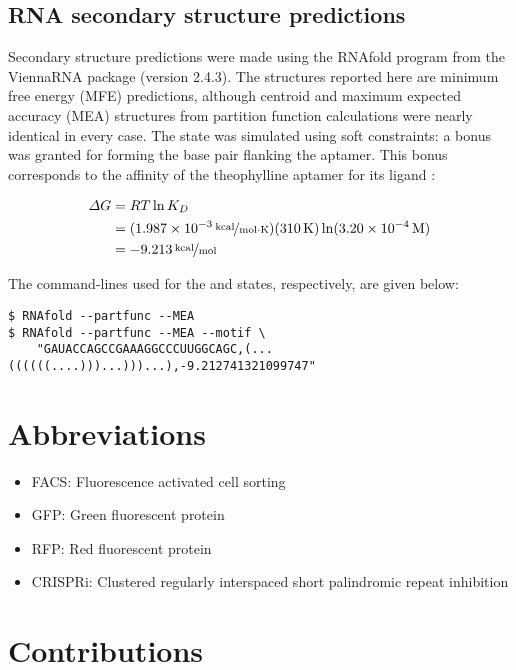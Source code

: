\documentclass[10pt,oneside]{article}
\begin{document}
\subsection{RNA secondary structure predictions}

Secondary structure predictions were made using the RNAfold program from the ViennaRNA package (version 2.4.3).  The structures reported here are minimum free energy (MFE) predictions, although centroid and maximum expected accuracy (MEA) structures from partition function calculations were nearly identical in every case.  The \holo{} state was simulated using soft constraints: a  bonus was granted for forming the base pair flanking the aptamer.  This bonus corresponds to the  affinity of the theophylline aptamer for its ligand \autocite{jenison1994}:

\begin{align*}
\Delta G
    &= RT \ln K_D \\
    &= (\unitfrac[\mathrm{1.987 \times 10^{-3}}]{kcal}{mol \cdot K}) 
       (\unit[\mathrm{310}]{K}) 
       \ln (\unit[\mathrm{3.20 \times 10^{-4}}]{M}) \\
    &= \unitfrac[\mathrm{-9.213}]{kcal}{mol} \\
\end{align*}

The command-lines used for the \apo{} and \holo{} states, respectively, are given below:

\begin{verbatim}
$ RNAfold --partfunc --MEA
$ RNAfold --partfunc --MEA --motif \
    "GAUACCAGCCGAAAGGCCCUUGGCAGC,(...((((((....)))...)))...),-9.212741321099747"
\end{verbatim}


\section{Abbreviations}

\begin{itemize}
    \item FACS: Fluorescence activated cell sorting
    \item GFP: Green fluorescent protein
    \item RFP: Red fluorescent protein
    \item CRISPRi: Clustered regularly interspaced short palindromic repeat inhibition
\end{itemize}

\section{Contributions}
\end{document}
